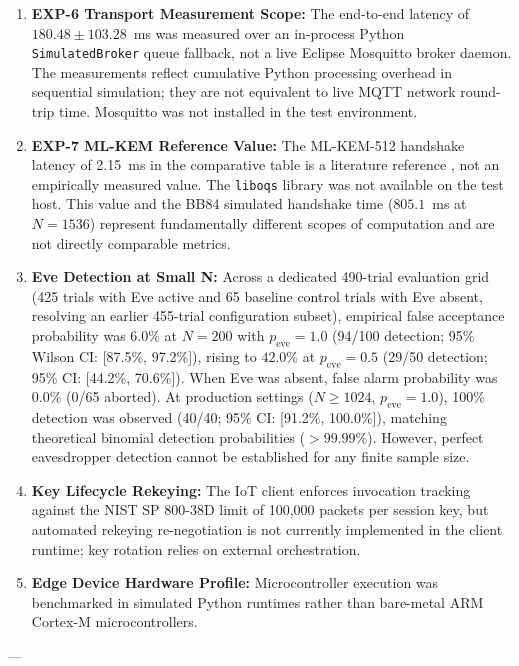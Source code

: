 \documentclass[journal,10pt,twocolumn]{article}
\begin{document}
\begin{enumerate}
    \item \textbf{EXP-6 Transport Measurement Scope:} The end-to-end latency of $180.48 \pm 103.28$~ms was measured over an in-process Python \texttt{SimulatedBroker} queue fallback, not a live Eclipse Mosquitto broker daemon. The measurements reflect cumulative Python processing overhead in sequential simulation; they are not equivalent to live MQTT network round-trip time. Mosquitto was not installed in the test environment.
    \item \textbf{EXP-7 ML-KEM Reference Value:} The ML-KEM-512 handshake latency of 2.15~ms in the comparative table is a literature reference \cite{shehzadi2025kyber, nist2024fips203}, not an empirically measured value. The \texttt{liboqs} library was not available on the test host. This value and the BB84 simulated handshake time ($805.1$~ms at $N=1536$) represent fundamentally different scopes of computation and are not directly comparable metrics.
    \item \textbf{Eve Detection at Small N:} Across a dedicated 490-trial evaluation grid (425 trials with Eve active and 65 baseline control trials with Eve absent, resolving an earlier 455-trial configuration subset), empirical false acceptance probability was $6.0\%$ at $N=200$ with $p_{\text{eve}}=1.0$ (94/100 detection; 95\% Wilson CI: [87.5\%, 97.2\%]), rising to $42.0\%$ at $p_{\text{eve}}=0.5$ (29/50 detection; 95\% CI: [44.2\%, 70.6\%]). When Eve was absent, false alarm probability was $0.0\%$ (0/65 aborted). At production settings ($N \ge 1024$, $p_{\text{eve}}=1.0$), 100\% detection was observed (40/40; 95\% CI: [91.2\%, 100.0\%]), matching theoretical binomial detection probabilities ($>99.99\%$). However, perfect eavesdropper detection cannot be established for any finite sample size.
    \item \textbf{Key Lifecycle Rekeying:} The IoT client enforces invocation tracking against the NIST SP 800-38D limit of 100,000 packets per session key, but automated rekeying re-negotiation is not currently implemented in the client runtime; key rotation relies on external orchestration.
    \item \textbf{Edge Device Hardware Profile:} Microcontroller execution was benchmarked in simulated Python runtimes rather than bare-metal ARM Cortex-M microcontrollers.
\end{enumerate}

---
\end{document}
